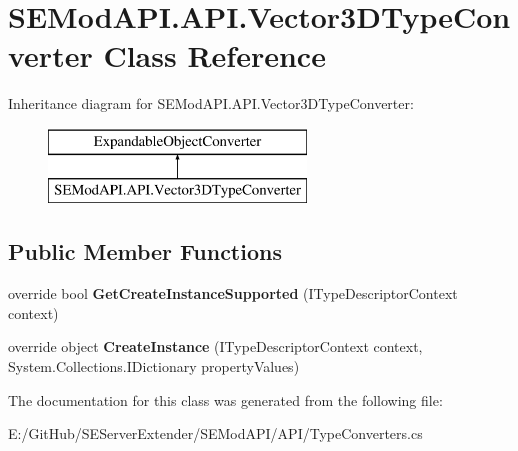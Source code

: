 \hypertarget{class_s_e_mod_a_p_i_1_1_a_p_i_1_1_vector3_d_type_converter}{}\section{S\+E\+Mod\+A\+P\+I.\+A\+P\+I.\+Vector3\+D\+Type\+Converter Class Reference}
\label{class_s_e_mod_a_p_i_1_1_a_p_i_1_1_vector3_d_type_converter}
Inheritance diagram for S\+E\+Mod\+A\+P\+I.\+A\+P\+I.\+Vector3\+D\+Type\+Converter\+:\begin{figure}[H]
\begin{center}
\leavevmode
\includegraphics[height=2.000000cm]{class_s_e_mod_a_p_i_1_1_a_p_i_1_1_vector3_d_type_converter}
\end{center}
\end{figure}
\subsection*{Public Member Functions}
\begin{DoxyCompactItemize}
\item 
\hypertarget{class_s_e_mod_a_p_i_1_1_a_p_i_1_1_vector3_d_type_converter_a38686dfd3cceeeb0db2b131272d20b7b}{}override bool {\bfseries Get\+Create\+Instance\+Supported} (I\+Type\+Descriptor\+Context context)\label{class_s_e_mod_a_p_i_1_1_a_p_i_1_1_vector3_d_type_converter_a38686dfd3cceeeb0db2b131272d20b7b}

\item 
\hypertarget{class_s_e_mod_a_p_i_1_1_a_p_i_1_1_vector3_d_type_converter_a1283ce19fe020c7492befb8ce86d113f}{}override object {\bfseries Create\+Instance} (I\+Type\+Descriptor\+Context context, System.\+Collections.\+I\+Dictionary property\+Values)\label{class_s_e_mod_a_p_i_1_1_a_p_i_1_1_vector3_d_type_converter_a1283ce19fe020c7492befb8ce86d113f}

\end{DoxyCompactItemize}


The documentation for this class was generated from the following file\+:\begin{DoxyCompactItemize}
\item 
E\+:/\+Git\+Hub/\+S\+E\+Server\+Extender/\+S\+E\+Mod\+A\+P\+I/\+A\+P\+I/Type\+Converters.\+cs\end{DoxyCompactItemize}
